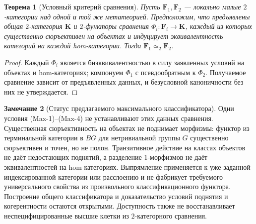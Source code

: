 \documentclass[11pt]{article}
\theoremstyle{plain}
\newtheorem{theorem}{Теорема}[section]
\theoremstyle{definition}
\newtheorem{remark}[theorem]{Замечание}
\begin{document}
\begin{theorem}[Условный критерий сравнения]\label{thm:meta-cat}
Пусть $\mathbf F_1, \mathbf F_2$ — локально малые $2$-категории над одной и той же метатеорией. Предположим, что предъявлены общая $2$-категория $\mathbf K$ и $2$-функторы сравнения $\Phi_i : \mathbf F_i \to \mathbf K$, каждый из которых существенно сюръективен на объектах и индуцирует эквивалентность категорий на каждой hom-категории. Тогда $\mathbf F_1 \simeq_2 \mathbf F_2$.
\end{theorem}
\begin{proof}
Каждый $\Phi_i$ является биэквивалентностью в силу заявленных условий на объектах и hom-категориях; компонуем $\Phi_1$ с псевдообратным к $\Phi_2$. Получаемое сравнение зависит от предъявленных данных, и безусловной каноничности без них не утверждается.
\end{proof}

\begin{remark}[Статус предлагаемого максимального классификатора]
Одни условия (Max-1)--(Max-4) не устанавливают этих данных сравнения. Существенная сюръективность на объектах не поднимает морфизмы: функтор из терминальной категории в $BG$ для нетривиальной группы $G$ существенно сюръективен и точен, но не полон. Транзитивное действие на классах объектов не даёт недостающих поднятий, а разделение $1$-морфизмов не даёт эквивалентностей на hom-категориях. Выпрямление применяется к уже заданной индексированной категории или расслоению и не фабрикует требуемого универсального свойства из произвольного классификационного функтора. Построение общего классификатора и доказательство условий поднятия и когерентности остаются открытыми. Доступность также не восстанавливает неспецифицированные высшие клетки из $2$-категорного сравнения.
\end{remark}
\end{document}
